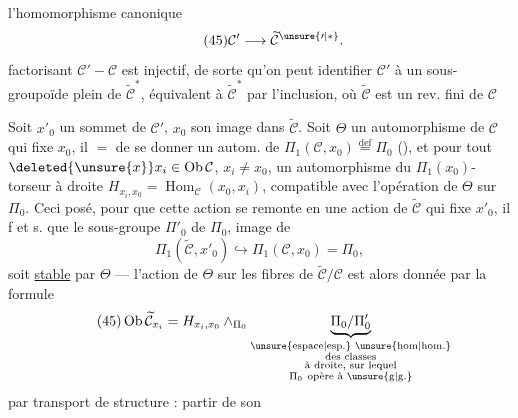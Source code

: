 l'homomorphisme canonique
\[
\tag{45}\mathcal C'\longrightarrow\widetilde{\mathcal C}^{\unsure{\prime|*}}.
\]
 factorisant $\mathcal C'\mathbin{-}\mathcal C$ est injectif, de sorte qu'on peut identifier $\mathcal C'$ à un sous-groupoïde plein de $\widetilde{\mathcal C}^{*}$, équivalent à $\widetilde{\mathcal C}^{*}$ par l'inclusion, où $\widetilde{\mathcal C}$ est un rev. fini de $\mathcal C$

Soit $x'_0$ un sommet de $\mathcal C'$, $x_0$ son image dans $\widetilde{\mathcal C}$. Soit $\Theta$ un automorphisme de $\mathcal C$ qui fixe $x_0$, il   $=$ de se donner un autom. de  $\Pi_1(\mathcal C,x_0)\overset{\mathrm{def}}{=}\Pi_0$ (), et pour tout  $\deleted{\unsure{x}}x_i\in\operatorname{Ob}\mathcal C$, $x_i\ne x_0$, un automorphisme du $\Pi_1(x_0)$-torseur à droite $H_{x_i,x_0}=\operatorname{Hom}_{\mathcal C}(x_0,x_i)$, compatible avec l'opération de $\Theta$ sur $\Pi_0$. Ceci posé, pour que cette action se remonte en une action de $\widetilde{\mathcal C}$ qui fixe $x'_0$, il f et s. que le sous-groupe $\Pi'_0$ de $\Pi_0$, image de 
\[
\Pi_1(\widetilde{\mathcal C},x'_0)\hookrightarrow\Pi_1(\mathcal C,x_0)=\Pi_0,
\]
soit \uline{stable} par $\Theta$ --- l'action de $\Theta$ sur les fibres  de $\widetilde{\mathcal C}/\mathcal C$ est alors donnée par la formule
\[
\tag{45}\operatorname{Ob}\widetilde{\mathcal C}_{x_i}=H_{x_i,x_0}\wedge_{\Pi_0}\underbrace{\Pi_0/\Pi'_0}_{\substack{\text{\unsure{espace|esp.} \unsure{hom|hom.}}\\\text{des classes}\\\text{à droite, sur lequel}\\\Pi_0\ \text{opère à \unsure{g|g.}}}}
\]
par transport de structure : partir de son
